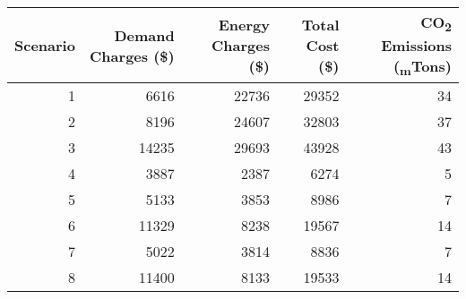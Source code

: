 \begin{tabular}{rrrrr}
\toprule
 Scenario &  Demand Charges (\$) &  Energy Charges (\$) &  Total Cost (\$) &  CO\textsubscript{2} Emissions (\textsubscript{m}Tons) \\
\midrule
        1 &                6616 &               22736 &           29352 &         34 \\
        2 &                8196 &               24607 &           32803 &         37 \\
        3 &               14235 &               29693 &           43928 &         43 \\
        4 &                3887 &                2387 &            6274 &          5 \\
        5 &                5133 &                3853 &            8986 &          7 \\
        6 &               11329 &                8238 &           19567 &         14 \\
        7 &                5022 &                3814 &            8836 &          7 \\
        8 &               11400 &                8133 &           19533 &         14 \\
\bottomrule
\end{tabular}
